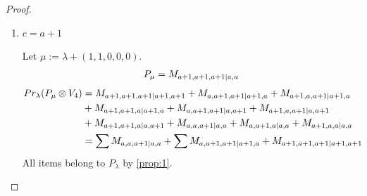 \begin{proof}
\begin{enumerate}
\begin{enumerate}
        \item $c=a+1$ \par
        Let $\mu:=\lambda + (1,1,0,0,0) $.
        \begin{equation}\notag
          \begin{aligned}
            P_\mu = M_{a+1,a+1,a+1|a,a}
          \end{aligned}
        \end{equation}
        \begin{equation}\notag
          \begin{aligned}
            Pr_{\lambda}(P_\mu \otimes V_{4}) &=
M_{a+1,a+1,a+1|a+1,a+1}
+ M_{a,a+1,a+1|a+1,a}
+ M_{a+1,a,a+1|a+1,a}\\
                                              &
+ M_{a+1,a+1,a|a+1,a}
+ M_{a,a+1,a+1|a,a+1}
+ M_{a+1,a,a+1|a,a+1}\\
                                              &
+ M_{a+1,a+1,a|a,a+1}
+ M_{a,a,a+1|a,a}
+ M_{a,a+1,a|a,a}
+ M_{a+1,a,a|a,a} \\
                                               &=
\sum M_{a,a,a+1|a,a}
+ \sum M_{a,a+1,a+1|a+1,a}
+  M_{a+1,a+1,a+1|a+1,a+1}
          \end{aligned}
        \end{equation}
All items belong to $P_\lambda$ by \cref{prop:1}.
      \end{enumerate}


\end{enumerate}
\end{proof}
